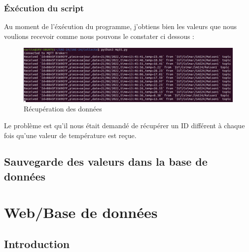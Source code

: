 \documentclass[12pt, a4paper]{article}
\begin{document}
		\subsubsection{Éxécution du script}
		Au moment de l'éxécution du programme, j'obtiens bien les valeurs que 
		nous voulions recevoir comme nous pouvons le constater ci dessous :
		\begin{figure}[H]
			\centering
			\includegraphics[width=1\textwidth]{img/recup.png}
			\caption{Récupération des données}
			\label{fig:recup}
		\end{figure}
		Le problème est qu'il nous était demandé de récupérer un ID différent
		à chaque fois qu'une valeur de température est reçue.

	\subsection{Sauvegarde des valeurs dans la base de données}


\newpage
\section{Web/Base de données}
\subsection{Introduction}
\end{document}
